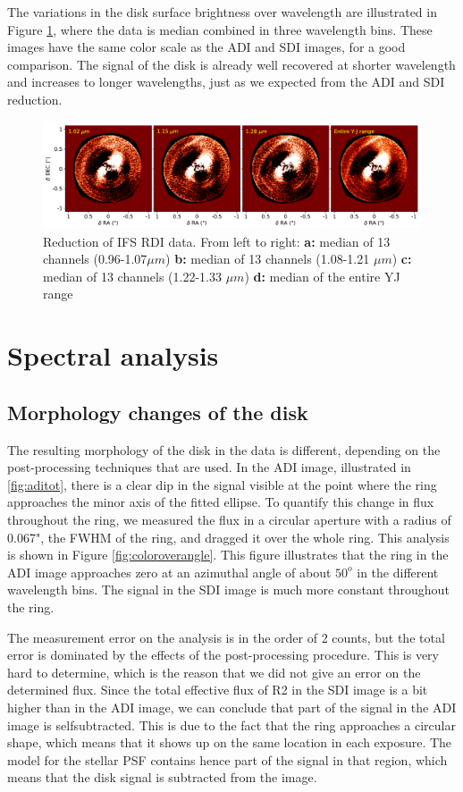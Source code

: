 \documentclass[twoside,single,12pt]{lion-msc}
\begin{document}
The variations in the disk surface brightness over wavelength are illustrated in Figure \ref{fig:RDIcolor}, where the data is median combined in three wavelength bins. These images have the same color scale as the ADI and SDI images, for a good comparison. The signal of the disk is already well recovered at shorter wavelength and increases to longer wavelengths, just as we expected from the ADI and SDI reduction.

\begin{figure}[htb]
\centering
\includegraphics[trim={0cm 0cm 0cm 0cm},clip,width = 1.01\textwidth]{RDI_color_imcon}
\caption{Reduction of IFS RDI data. From left to right: \textbf{a:} median of 13 channels (0.96-1.07$\mu m$) \textbf{b:} median of 13 channels (1.08-1.21 $\mu m$) \textbf{c:} median of 13 channels (1.22-1.33 $\mu m$) \textbf{d:} median of the entire YJ range}
\label{fig:RDIcolor}
\end{figure}

\chapter{Spectral analysis}
\section{Morphology changes of the disk}
The resulting morphology of the disk in the data is different, depending on the post-processing techniques that are used. In the ADI image, illustrated in \ref{fig:aditot}, there is a clear dip in the signal visible at the point where the ring approaches the minor axis of the fitted ellipse. To quantify this change in flux throughout the ring, we measured the flux in a circular aperture with a radius of 0.067", the FWHM of the ring, and dragged it over the whole ring. This analysis is shown in Figure \ref{fig:coloroverangle}. This figure illustrates that the ring in the ADI image approaches zero at an azimuthal angle of about $50^o$ in the different wavelength bins. The signal in the SDI image is much more constant throughout the ring. 
\bigskip

The measurement error on the analysis is in the order of 2 counts, but the total error is dominated by the effects of the post-processing procedure. This is very hard to determine, which is the reason that we did not give an error on the determined flux. Since the total effective flux of R2 in the SDI image is a bit higher than in the ADI image, we can conclude that part of the signal in the ADI image is selfsubtracted. This is due to the fact that the ring approaches a circular shape, which means that it shows up on the same location in each exposure. The model for the stellar PSF contains hence part of the signal in that region, which means that the disk signal is subtracted from the image. 
\bigskip
\end{document}
